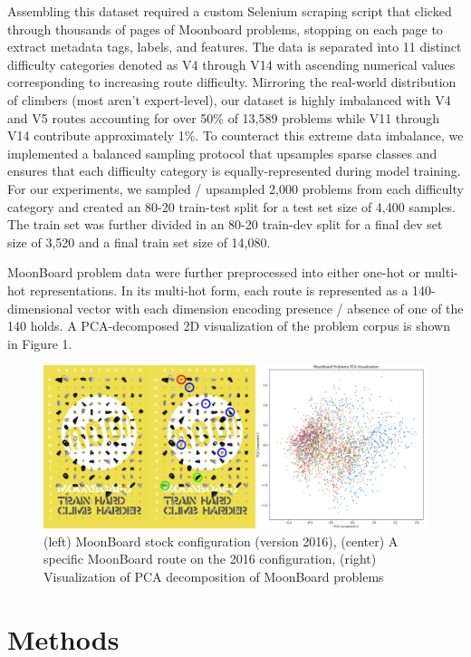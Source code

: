 \documentclass{article}
\begin{document}
Assembling this dataset required a custom Selenium scraping script that clicked through thousands of pages of Moonboard problems, stopping on each page to extract metadata tags, labels, and features. The data is separated into 11 distinct difficulty categories denoted as V4 through V14 with ascending numerical values corresponding to increasing route difficulty. Mirroring the real-world distribution of climbers (most aren't expert-level), our dataset is highly imbalanced with V4 and V5 routes accounting for over 50\% of 13,589 problems while V11 through V14 contribute approximately 1\%. To counteract this extreme data imbalance, we implemented a balanced sampling protocol that upsamples sparse classes and ensures that each difficulty category is equally-represented during model training. For our experiments, we sampled / upsampled 2,000 problems from each difficulty category and created an 80-20 train-test split for a test set size of 4,400 samples. The train set was further divided in an 80-20 train-dev split for a final dev set size of 3,520 and a final train set size of 14,080.

MoonBoard problem data were further preprocessed into either one-hot or multi-hot representations. In its multi-hot form, each route is represented as a 140-dimensional vector with each dimension encoding presence / absence of one of the 140 holds. A PCA-decomposed 2D visualization of the problem corpus is shown in Figure 1.

\begin{figure}[h]
\centering
\includegraphics[width=.9\textwidth]{moondata}

\label{fig: MoonBoard data description}
\caption{(left) MoonBoard stock configuration (version 2016), (center) A specific MoonBoard route on the 2016 configuration, (right) Visualization of PCA decomposition of MoonBoard problems}
\end{figure}

\section{Methods}
\end{document}
